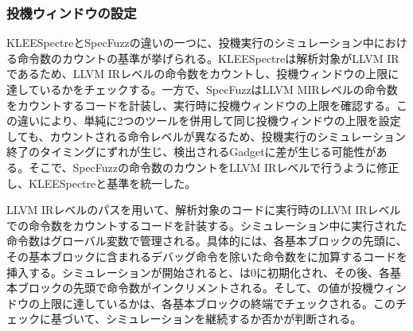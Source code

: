 \subsubsection{投機ウィンドウの設定}
KLEESpectreとSpecFuzzの違いの一つに、投機実行のシミュレーション中における命令数のカウントの基準が挙げられる。KLEESpectreは解析対象がLLVM IRであるため、LLVM IRレベルの命令数をカウントし、投機ウィンドウの上限に達しているかをチェックする。一方で、SpecFuzzはLLVM MIRレベルの命令数をカウントするコードを計装し、実行時に投機ウィンドウの上限を確認する。この違いにより、単純に2つのツールを併用して同じ投機ウィンドウの上限を設定しても、カウントされる命令レベルが異なるため、投機実行のシミュレーション終了のタイミングにずれが生じ、検出されるGadgetに差が生じる可能性がある。そこで、SpecFuzzの命令数のカウントをLLVM IRレベルで行うように修正し、KLEESpectreと基準を統一した。\par
LLVM IRレベルのパスを用いて、解析対象のコードに実行時のLLVM IRレベルでの命令数をカウントするコードを計装する。シミュレーション中に実行された命令数はグローバル変数で管理される。具体的には、各基本ブロックの先頭に、その基本ブロックに含まれるデバッグ命令を除いた命令数をに加算するコードを挿入する。シミュレーションが開始されると、は0に初期化され、その後、各基本ブロックの先頭で命令数がインクリメントされる。そして、の値が投機ウィンドウの上限に達しているかは、各基本ブロックの終端でチェックされる。このチェックに基づいて、シミュレーションを継続するか否かが判断される。

